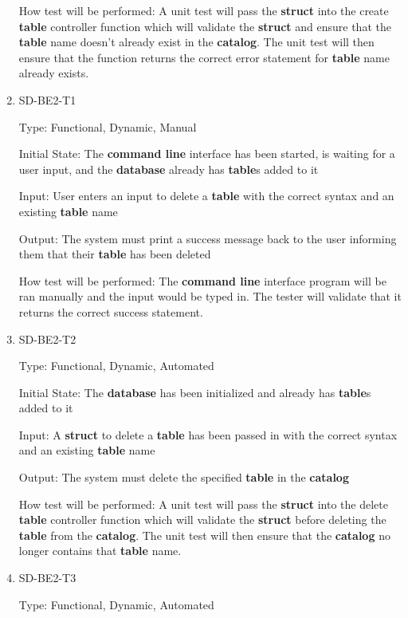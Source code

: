 \documentclass[12pt, titlepage]{article}
\begin{document}
\begin{enumerate}
How test will be performed: A unit test will pass the \textbf{struct} into the create \textbf{table} controller function which will validate the \textbf{struct} and ensure that the \textbf{table} name doesn't already exist in the \textbf{catalog}. The unit test will then ensure that the function returns the correct error statement for \textbf{table} name already exists.

\item{SD-BE2-T1}

Type: Functional, Dynamic, Manual
					
Initial State: The \textbf{command line} interface has been started, is waiting for a user input, and the \textbf{database} already has \textbf{table}s added to it
					
Input: User enters an input to delete a \textbf{table} with the correct syntax and an existing \textbf{table} name
					
Output: The system must print a success message back to the user informing them that their \textbf{table} has been deleted
					
How test will be performed: The \textbf{command line} interface program will be ran manually and the input would be typed in. The tester will validate that it returns the correct success statement.

\item{SD-BE2-T2}

Type: Functional, Dynamic, Automated
					
Initial State: The \textbf{database} has been initialized and already has \textbf{table}s added to it
					
Input: A \textbf{struct} to delete a \textbf{table} has been passed in with the correct syntax and an existing \textbf{table} name
					
Output: The system must delete the specified \textbf{table} in the \textbf{catalog}
					
How test will be performed: A unit test will pass the \textbf{struct} into the delete \textbf{table} controller function which will validate the \textbf{struct} before deleting the \textbf{table} from the \textbf{catalog}. The unit test will then ensure that the \textbf{catalog} no longer contains that \textbf{table} name.

\item{SD-BE2-T3}

Type: Functional, Dynamic, Automated
					

\end{enumerate}
\end{document}
